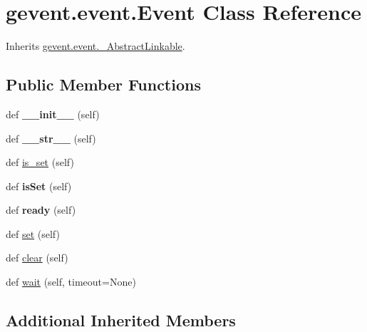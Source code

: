 \hypertarget{classgevent_1_1event_1_1_event}{}\section{gevent.\+event.\+Event Class Reference}
\label{classgevent_1_1event_1_1_event}


Inherits \hyperlink{classgevent_1_1event_1_1___abstract_linkable}{gevent.\+event.\+\_\+\+Abstract\+Linkable}.

\subsection*{Public Member Functions}
\begin{DoxyCompactItemize}
\item 
\mbox{\label{classgevent_1_1event_1_1_event_ae6f4be04924a16ac036f063c17c8a053}} 
def {\bfseries \+\_\+\+\_\+init\+\_\+\+\_\+} (self)
\item 
\mbox{\label{classgevent_1_1event_1_1_event_a8b9bfb797c0eae276d09184a7b57ba17}} 
def {\bfseries \+\_\+\+\_\+str\+\_\+\+\_\+} (self)
\item 
def \hyperlink{classgevent_1_1event_1_1_event_a5e28557387cbec46930dba5b29469360}{is\+\_\+set} (self)
\item 
\mbox{\label{classgevent_1_1event_1_1_event_a1eb9928dbad4b48b9cdd27bfa1dcdf9e}} 
def {\bfseries is\+Set} (self)
\item 
\mbox{\label{classgevent_1_1event_1_1_event_a71bdb71ef55c1ccc53b5ddbaeff6c0c5}} 
def {\bfseries ready} (self)
\item 
def \hyperlink{classgevent_1_1event_1_1_event_aa5efca322b515fc7d3f63421c5d306f2}{set} (self)
\item 
def \hyperlink{classgevent_1_1event_1_1_event_a45c1c24e6a87f2595c7e6c3276a55ec4}{clear} (self)
\item 
def \hyperlink{classgevent_1_1event_1_1_event_a43ae57bb509c35b4d91491b8caea3378}{wait} (self, timeout=None)
\end{DoxyCompactItemize}
\subsection*{Additional Inherited Members}


